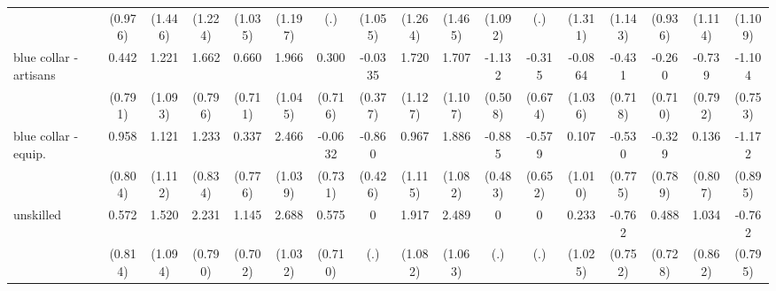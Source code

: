 {\begin{tabular}{l*{16}{c}}
                    &     (0.976)         &     (1.446)         &     (1.224)         &     (1.035)         &     (1.197)         &         (.)         &     (1.055)         &     (1.264)         &     (1.465)         &     (1.092)         &         (.)         &     (1.311)         &     (1.143)         &     (0.936)         &     (1.114)         &     (1.109)         \\
[1em]
blue collar - artisans&       0.442         &       1.221         &       1.662\sym{*}  &       0.660         &       1.966         &       0.300         &     -0.0335         &       1.720         &       1.707         &      -1.132\sym{*}  &      -0.315         &     -0.0864         &      -0.431         &      -0.260         &      -0.739         &      -1.104         \\
                    &     (0.791)         &     (1.093)         &     (0.796)         &     (0.711)         &     (1.045)         &     (0.716)         &     (0.377)         &     (1.127)         &     (1.107)         &     (0.508)         &     (0.674)         &     (1.036)         &     (0.718)         &     (0.710)         &     (0.792)         &     (0.753)         \\
[1em]
blue collar - equip.&       0.958         &       1.121         &       1.233         &       0.337         &       2.466\sym{*}  &     -0.0632         &      -0.860\sym{*}  &       0.967         &       1.886         &      -0.885         &      -0.579         &       0.107         &      -0.530         &      -0.329         &       0.136         &      -1.172         \\
                    &     (0.804)         &     (1.112)         &     (0.834)         &     (0.776)         &     (1.039)         &     (0.731)         &     (0.426)         &     (1.115)         &     (1.082)         &     (0.483)         &     (0.652)         &     (1.010)         &     (0.775)         &     (0.789)         &     (0.807)         &     (0.895)         \\
[1em]
unskilled           &       0.572         &       1.520         &       2.231\sym{**} &       1.145         &       2.688\sym{**} &       0.575         &           0         &       1.917         &       2.489\sym{*}  &           0         &           0         &       0.233         &      -0.762         &       0.488         &       1.034         &      -0.762         \\
                    &     (0.814)         &     (1.094)         &     (0.790)         &     (0.702)         &     (1.032)         &     (0.710)         &         (.)         &     (1.082)         &     (1.063)         &         (.)         &         (.)         &     (1.025)         &     (0.752)         &     (0.728)         &     (0.862)         &     (0.795)         \\

\end{tabular}}
